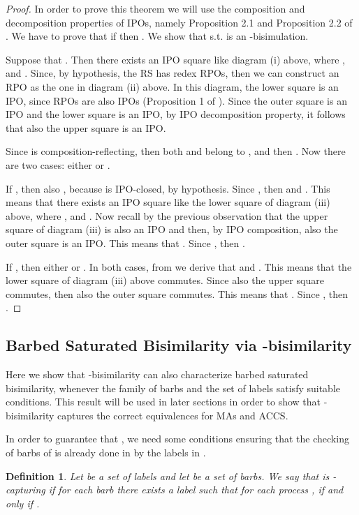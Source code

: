 \documentclass[copyright,creativecommons]{eptcs}
\newcommand{\<}{\langle}
\renewcommand{\>}{\rangle}
\newtheorem{definition}{Definition}{}
\begin{document}
\begin{proof}

  In order to prove this theorem we will use the composition and decomposition properties
  of IPOs, namely Proposition 2.1 and Proposition 2.2 of \cite{DBLP:conf/concur/LeiferM00}.
  We have to prove that if  then .
We show that  s.t.  is an -bisimulation.



  Suppose that . Then there exists
  an IPO square like diagram (i) above, where
 , 
  and . Since, by hypothesis, the RS has
  redex RPOs, then we can construct an RPO as the one in diagram
  (ii) above. In this diagram, the lower square is an IPO, since RPOs
  are also IPOs (Proposition 1 of
  \cite{DBLP:conf/concur/LeiferM00}). Since the outer square is an IPO and the
  lower square is an IPO, by IPO decomposition property, it follows that
 also the upper square is an IPO.

Since  is composition-reflecting, then both  and
 belong to , and then . Now there
are two cases: either  or .

If , then also , because  is IPO-closed,
by hypothesis. Since , then  and . This means that there exists an IPO square like the
lower square of diagram (iii) above, where ,
 and . Now recall by the previous
observation that the upper square of diagram (iii) is also an IPO
and then, by IPO composition, also the outer square is an IPO. This
means that . Since , then
.

If , then either  or . In both
cases, from  we derive that  and
. This means that the lower square of diagram
(iii) above commutes. Since also the upper square commutes, then
also the outer square commutes. This means that . Since , then .
\end{proof}

\subsection{Barbed Saturated Bisimilarity via -bisimilarity}\label{L=BS}


Here we show that -bisimilarity can also characterize barbed
saturated bisimilarity, whenever the family of barbs and the set of
labels  satisfy suitable conditions. This result will be used in
later sections in order to show that -bisimilarity captures the
correct equivalences for MAs and ACCS.

In order to guarantee that , we need some
conditions ensuring that the checking of barbs of  is
already done in  by the labels in .
\begin{definition}\label{def:PredCapturing}
Let  be a set of labels and let  be a set of barbs. We say
that  is \emph{-capturing} if for each barb  there exists a
label  such that for each process ,  if and only if
.
\end{definition}
\end{document}
